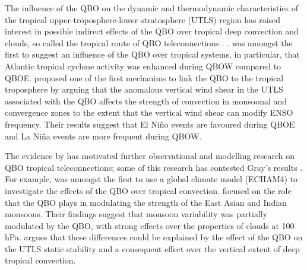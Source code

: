  The influence of the QBO on the dynamic and thermodynamic characteristics of the tropical upper-troposphere-lower stratosphere  (UTLS) region has raised interest in possible indirect effects of the QBO over tropical deep convection and clouds, so called the tropical route of QBO teleconnections \citep{gray2018}.
 .
\cite{gray1984} was amongst the first to suggest an influence of the QBO over tropical systems, in particular, that Atlantic tropical cyclone activity was enhanced during QBOW compared to QBOE. 
{\color{blue}\cite{gray1992} proposed one of the first mechanims to link the QBO to the tropical troposphere by arguing that the anomalous vertical wind shear in the UTLS associated with the QBO affects the strength of convection in monsoonal and convergence zones to the extent that the vertical wind shear can modify ENSO frequency.} Their results suggest that El Niño events are favoured during QBOE and  La Niña events are more frequent during QBOW.

The evidence by \cite{gray1992} has motivated further observational and modelling research on QBO tropical teleconnections; some of this research has contested Gray's results \citep[e.g.][]{chan1995,camargo2010,hansen2016tropospheric}. 
For example, \cite{giorgetta1999} was amongst the first to use a global climate model (ECHAM4) to investigate the effects of the QBO over tropical convection. \cite{giorgetta1999} focused on the role that the QBO plays in modulating the strength of the East Asian and Indian monsoons. Their findings suggest that monsoon variability was partially modulated by the QBO, with strong effects over the properties of clouds at 100 hPa. \cite{giorgetta1999} argues that these differences could be explained by the effect of the QBO on the UTLS static stability and a consequent effect over the vertical extent of deep tropical convection. 

